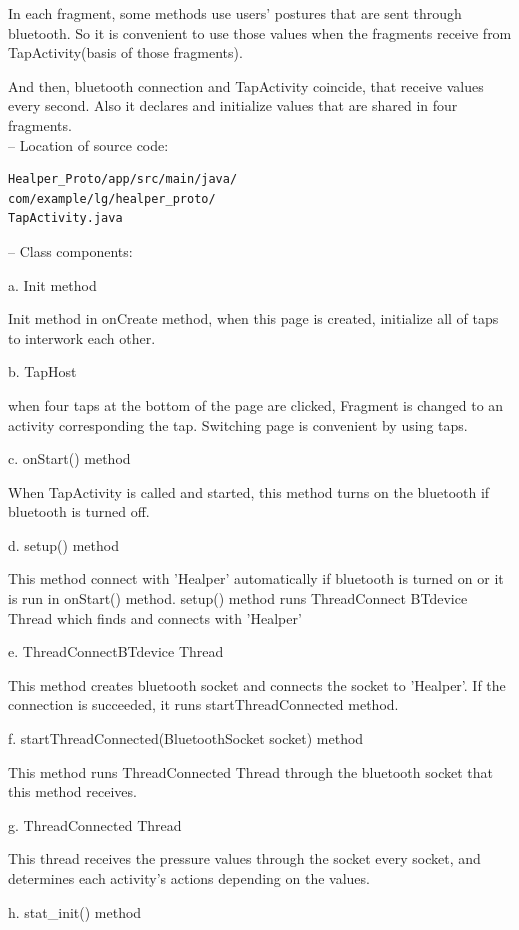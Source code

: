 \documentclass[conference]{IEEEtran}
\begin{document}
In each fragment, some methods use users' postures that are sent through bluetooth. So it is convenient to use those values when the fragments receive from TapActivity(basis of those fragments).

And then, bluetooth connection and TapActivity coincide, that receive values every second. Also it declares and initialize values that are shared in four fragments.
\\

 --	Location of source code:
 
\begin{verbatim}
Healper_Proto/app/src/main/java/
com/example/lg/healper_proto/
TapActivity.java
 \end{verbatim}
 
 --	Class components:

a. Init method

Init method in onCreate method, when this page is created, initialize all of taps to interwork each other. 

b. TapHost

when four taps at the bottom of the page are clicked, Fragment is changed to an activity corresponding the tap. Switching page is convenient by using taps. 

c. onStart() method

When TapActivity is called and started, this method turns on the bluetooth if bluetooth is turned off.

d. setup() method

This method connect with 'Healper' automatically if bluetooth is turned on or it is run in onStart() method. setup() method runs ThreadConnect BTdevice Thread which finds and connects with 'Healper'  

e. ThreadConnectBTdevice Thread

This method creates bluetooth socket and connects the socket to 'Healper'. If the connection is succeeded, it runs startThreadConnected method. 

f. startThreadConnected(BluetoothSocket socket) method

This method runs ThreadConnected Thread through the bluetooth socket that this method receives.

g. ThreadConnected Thread

This thread receives the pressure values through the socket every socket, and determines each activity's actions depending on the values.

h. stat\_{}init() method
\end{document}
